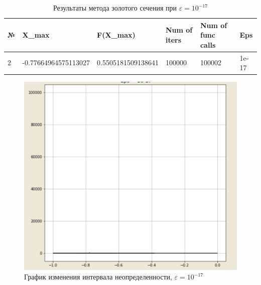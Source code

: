 \documentclass[10pt]{article}
\begin{document}
\begin{enumerate}
\begin{table}[H]
\caption{Результаты метода золотого сечения при $\varepsilon = 10^{-17}$}
\begin{center}
\begin{tabular}{|l|l|l|l|l|l|}
\hline
№ & X\_max    & F(X\_max) & Num of iters & Num of func calls & Eps  \\
\hline
    2 & -0.77664964575113027          &    0.5505181509138641  &              100000 &                  100002 &
1e-17 \\
\hline
\end{tabular}
\end{center}
\end{table}

\begin{figure}[H]
\centering
\includegraphics[width=0.8\linewidth]{6.png}
\caption{График изменения интервала неопределенности, $\varepsilon = 10^{-17}$}
\label{fig:image1}
\end{figure}
\newpage


\end{enumerate}
\end{document}
